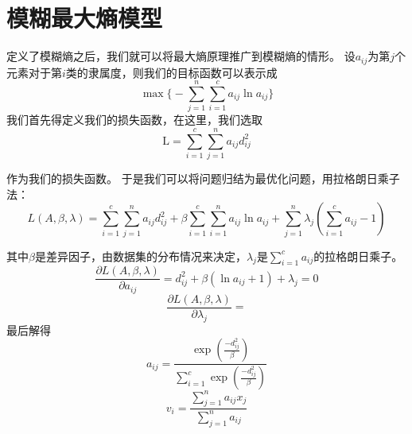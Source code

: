 \newpage
\section{模糊最大熵模型}
定义了模糊熵之后，我们就可以将最大熵原理推广到模糊熵的情形。
设$a_{i j}$为第$j$个元素对于第$i$类的隶属度，则我们的目标函数可以表示成
\begin{equation}
    \max \biggl\{-\sum_{j=1}^{n} \sum_{i=1}^{c} a_{i j}\ln a_{i j}\biggr\}
    \label{MEC}
\end{equation}
我们首先得定义我们的损失函数，在这里，我们选取
\begin{equation*}
    \mathrm{L}=\sum_{i=1}^{c} \sum_{j=1}^{n}a_{i j} d_{i j}^2
\end{equation*}

作为我们的损失函数。
于是我们可以将问题归结为最优化问题，用拉格朗日乘子法：
\begin{equation}
    L(A,\beta ,\lambda)=\sum_{i=1}^{c} \sum_{j=1}^{n} a_{i j} d_{i j}^2+\beta \sum_{i=1}^{c} \sum_{i=1}^{n} a_{i j} \ln a_{i j}+\sum_{j=1}^{n} \lambda_{j}\left(\sum_{i=1}^{c} a_{i j}-1\right)
    \label{MLagrange}
\end{equation}

其中$\beta$是差异因子，由数据集的分布情况来决定，$\lambda_j$是$\sum\limits_{i=1}^{c} a_{i j}$的拉格朗日乘子。
\begin{equation}
    \frac{\partial L(A,\beta ,\lambda) }{\partial a_{i j}} =d_{i j}^2+\beta(\ln a_{i j}+1)+\lambda_j=0
\end{equation}
\begin{equation}
    \frac{\partial L(A,\beta ,\lambda)}{\partial \lambda_j}=
\end{equation}
最后解得
\begin{equation}
    a_{i j}=\frac{ \exp(\frac{-d_{i j}^2}{\beta})}{\sum\limits_{i=1}^c\exp(\frac{-d_{i j}^2}{\beta})}
\end{equation}
\begin{equation}
    v_i =\frac{\sum\limits_{j=1}^n a_{i j} x_j}{\sum\limits_{j=1}^n a_{i j}}
\end{equation}
